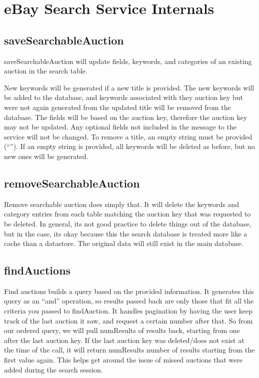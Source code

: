 \documentclass[12pt,a4paper]{article}
\begin{document}
\pagebreak
\section{eBay Search Service Internals}
\subsection{saveSearchableAuction}
saveSearchableAuction will update fields, keywords, and categories of an
existing auction in the search table.

New keywords will be generated if a new title is provided. The new keywords
will be added to the database, and keywords associated with they auction key
but were not again generated from the updated title will be removed from the
database. The fields will be based on the auction key, therefore the auction
key may not be updated. Any optional fields not included in the message to the
service will not be changed. To remove a title, an empty string must be
provided (``''). If an empty string is provided, all keywords will be deleted
as before, but no new ones will be generated.

\subsection{removeSearchableAuction}
Remove searchable auction does simply that. It will delete the keywords and
category entries from each table matching the auction key that was requested to
be deleted. In general, its not good practice to delete things out of the
database, but in the case, its okay because this the search database is treated
more like a cache than a datastore. The original data will still exist in the
main database.

\subsection{findAuctions}
Find auctions builds a query based on the provided information. It generates
this query as an ``and'' operation, so results passed back are only those that
fit all the criteria you passed to findAuction. It handles pagination by having
the user keep track of the last auction it saw, and request a certain number
after that. So from our ordered query, we will pull numResults of results back,
starting from one after the last auction key. If the last auction key was
deleted/does not exist at the time of the call, it will return numResults
number of results starting from the first value again. This helps get around
the issue of missed auctions that were added during the search session.
\end{document}

